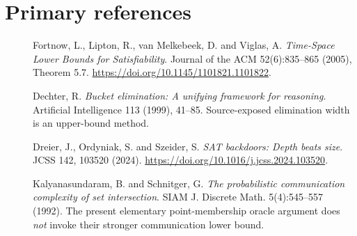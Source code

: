 \documentclass[11pt]{article}
\begin{document}
\section{Primary references}
\begin{description}
\item[] Fortnow, L., Lipton, R., van Melkebeek, D. and Viglas, A. \emph{Time-Space Lower Bounds for Satisfiability}. Journal of the ACM 52(6):835--865 (2005), Theorem 5.7. \url{https://doi.org/10.1145/1101821.1101822}.
\item[] Dechter, R. \emph{Bucket elimination: A unifying framework for reasoning}. Artificial Intelligence 113 (1999), 41--85. Source-exposed elimination width is an upper-bound method.
\item[] Dreier, J., Ordyniak, S. and Szeider, S. \emph{SAT backdoors: Depth beats size}. JCSS 142, 103520 (2024). \url{https://doi.org/10.1016/j.jcss.2024.103520}.
\item[] Kalyanasundaram, B. and Schnitger, G. \emph{The probabilistic communication complexity of set intersection}. SIAM J. Discrete Math. 5(4):545--557 (1992). The present elementary point-membership oracle argument does \emph{not} invoke their stronger communication lower bound.
\end{description}
\end{document}
